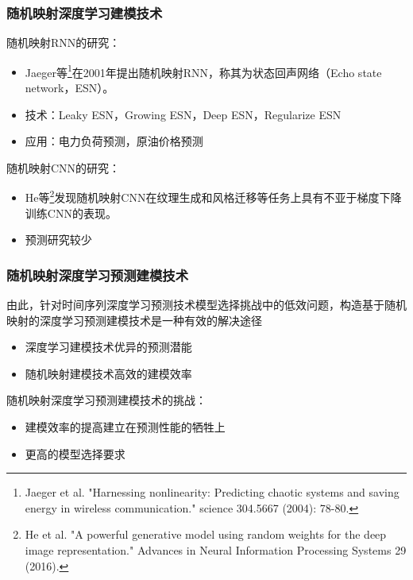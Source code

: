     \begin{frame}
        \frametitle{随机映射深度学习建模技术}
    
        随机映射RNN的研究：
        \begin{itemize}
            \item Jaeger等\footnote{Jaeger et al. "Harnessing nonlinearity: Predicting chaotic systems and saving energy in wireless communication." science 304.5667 (2004): 78-80.}在2001年提出随机映射RNN，称其为状态回声网络（Echo state network，ESN）。
            \item 技术：Leaky ESN，Growing ESN，Deep ESN，Regularize ESN
            \item 应用：电力负荷预测，原油价格预测
        \end{itemize}
    
        随机映射CNN的研究：
        \begin{itemize}
            \item He等\footnote{He et al. "A powerful generative model using random weights for the deep image representation." Advances in Neural Information Processing Systems 29 (2016).}发现随机映射CNN在纹理生成和风格迁移等任务上具有不亚于梯度下降训练CNN的表现。
            \item 预测研究较少
        \end{itemize} 
    \end{frame}

    \begin{frame}
        \frametitle{随机映射深度学习预测建模技术}
    
        由此，针对时间序列深度学习预测技术模型选择挑战中的低效问题，构造基于随机映射的深度学习预测建模技术是一种有效的解决途径
        \begin{itemize}
            \item 深度学习建模技术优异的预测潜能
            \item 随机映射建模技术高效的建模效率
        \end{itemize}
    
        \vspace{1em}
        随机映射深度学习预测建模技术的挑战：
        \begin{itemize}
            \item 建模效率的提高建立在预测性能的牺牲上
            \item 更高的模型选择要求
        \end{itemize}
    
    \end{frame}


